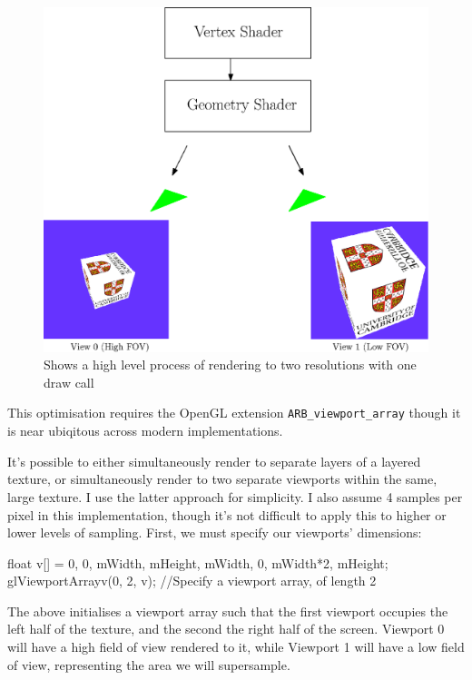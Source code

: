\documentclass[12pt,a4paper,twoside,openright]{report}
\begin{document}
\begin{figure}[tbh]
\centerline{\includegraphics[scale=0.6]{figs/geoshader.eps}}
\caption{Shows a high level process of rendering to two resolutions with one draw call}
\label{epsfig1}
\end{figure}



This optimisation requires the OpenGL extension \texttt{ARB\_viewport\_array} though it is near ubiqitous across modern implementations.

It's possible to either simultaneously render to separate layers of a layered texture, or simultaneously render to two separate viewports within the same, large texture. I use the latter approach for simplicity. I also assume 4 samples per pixel in this implementation, though it's not difficult to apply this to higher or lower levels of sampling. 
First, we must specify our viewports' dimensions:

\begin{blockcode}
float v[] = {0, 0, mWidth, mHeight,
             mWidth, 0, mWidth*2, mHeight};
glViewportArrayv(0, 2, v); //Specify a viewport array, of length 2
\end{blockcode} 

The above initialises a viewport array such that the first viewport occupies the left half of the texture, and the second the right half of the screen. Viewport 0 will have a high field of view rendered to it, while Viewport 1 will have a low field of view, representing the area we will supersample.\\
\end{document}
